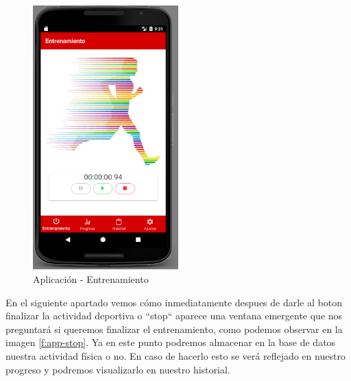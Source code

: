 \documentclass[a4paper, 11pt]{article}
\begin{document}
\begin{itemize}
            \begin{figure}[H]
             \centering
             \includegraphics[width=0.5\textwidth]{3pause}
             \caption{Aplicación - Entrenamiento}
             \label{f:app-pause}
            \end{figure}

  En el siguiente apartado vemos cómo inmediatamente despues de darle al boton finalizar la actividad
  deportiva o ``stop`` aparece una ventana emergente que nos preguntará si queremos finalizar el
  entrenamiento, como podemos observar en la imagen \ref{f:app-stop}. Ya en este punto podremos almacenar
  en la base de datos nuestra actividad física o no. En caso de hacerlo esto se verá reflejado en
  nuestro progreso y podremos visualizarlo en nuestro historial.\\



\end{itemize}
\end{document}
